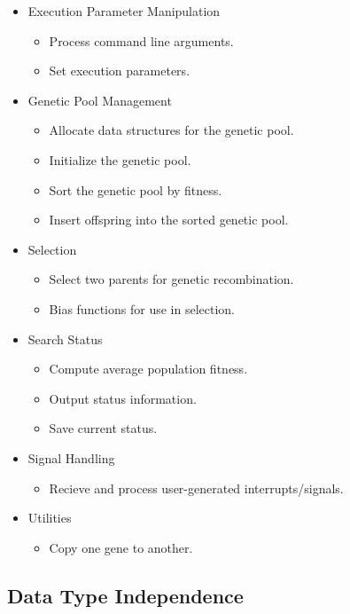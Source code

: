 \begin{itemize}

 \item Execution Parameter Manipulation
  \begin{itemize}
   \item Process command line arguments.
   \item Set execution parameters.
  \end{itemize}
 \item Genetic Pool Management
  \begin{itemize}
   \item Allocate data structures for the genetic pool.
   \item Initialize the genetic pool.
   \item Sort the genetic pool by fitness.
   \item Insert offspring into the sorted genetic pool.
  \end{itemize}
 \item Selection
  \begin{itemize}
   \item Select two parents for genetic recombination.
   \item Bias functions for use in selection.
  \end{itemize}
 \item Search Status
  \begin{itemize}
   \item Compute average population fitness.
   \item Output status information.
   \item Save current status.
  \end{itemize}
 \item Signal Handling
  \begin{itemize}
   \item Recieve and process user-generated interrupts/signals.
  \end{itemize}
 \item Utilities
  \begin{itemize}
   \item Copy one gene to another.
  \end{itemize}
 
\end{itemize}

\subsection{Data Type Independence}

